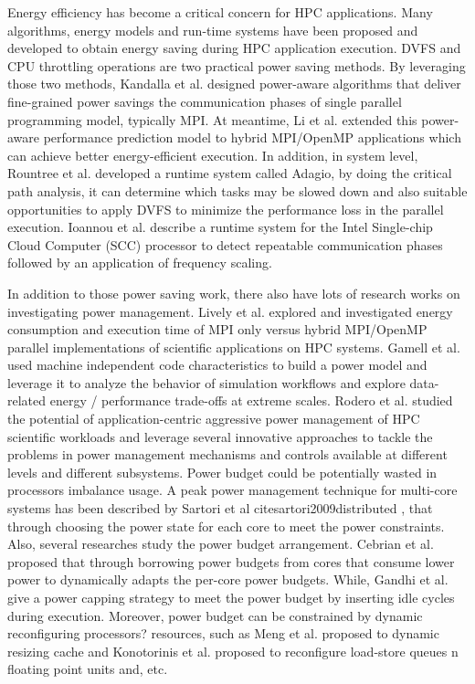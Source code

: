 \label{Section:related work}

Energy efficiency has become a critical concern for HPC applications. Many algorithms, energy models and run-time systems have been proposed and developed to obtain energy saving during HPC application execution. DVFS and CPU throttling operations are two practical power saving methods. By leveraging those two methods, Kandalla et al. \cite{kandalla2010designing} designed power-aware algorithms that deliver fine-grained power savings the communication phases of single parallel programming model, typically MPI. At meantime, Li et al. \cite{li2010hybrid} extended this power-aware performance prediction model to hybrid MPI/OpenMP applications which can achieve better energy-efficient execution. In addition, in system level, Rountree et al. \cite{rodero2010investigating} developed a runtime system called Adagio, by doing the critical path analysis, it can determine which tasks may be slowed down and also suitable opportunities to apply DVFS to minimize the performance loss in the parallel execution. Ioannou et al. \cite{ioannou2011phase}  describe a runtime system for the Intel Single-chip Cloud Computer (SCC) processor to detect repeatable communication phases followed by an application of frequency scaling. 

In addition to those power saving work, there also have lots of research works on investigating power management. Lively et al. \cite{lively2011energy}  explored and investigated energy consumption and execution time of MPI only versus hybrid MPI/OpenMP parallel implementations of scientific applications on HPC systems. Gamell et al. \cite{gamell2013exploring} used machine independent code characteristics to build a power model and leverage it to analyze the behavior of simulation workflows and explore data-related energy / performance trade-offs at extreme scales. Rodero et al. \cite{rodero2010investigating} studied the potential of application-centric aggressive power management of HPC scientific workloads and leverage several innovative approaches to tackle the problems in power management mechanisms and controls available at different levels and different subsystems. Power budget could be potentially wasted in processors imbalance usage. A peak power management technique for multi-core systems has been described by Sartori et al cite{sartori2009distributed} , that through choosing the power state for each core to meet the power constraints. Also, several researches study the power budget arrangement. Cebrian et al. \cite{cebrian2011power} proposed that through borrowing power budgets from cores that consume lower power to dynamically adapts the per-core power budgets. While, Gandhi et al. \cite{gandhi2009power} give a power capping strategy to meet the power budget by inserting idle cycles during execution. Moreover, power budget can be constrained by dynamic reconfiguring processors? resources, such as Meng et al. \cite{meng2008multi} proposed to dynamic resizing cache and Konotorinis et al. \cite{kontorinis2009reducing} proposed to reconfigure load-store queues n floating point units and, etc. 

